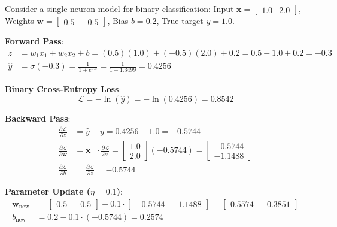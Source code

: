 \documentclass[12pt, a4paper]{report}
\theoremstyle{definition}
\begin{document}
\begin{numexample}
Consider a single-neuron model for binary classification:
Input $\mathbf{x} = \begin{bmatrix} 1.0 & 2.0 \end{bmatrix}$, Weights $\mathbf{w} = \begin{bmatrix} 0.5 & -0.5 \end{bmatrix}$, Bias $b = 0.2$, True target $y = 1.0$.

\textbf{Forward Pass}:
\begin{align*}
z &= w_1 x_1 + w_2 x_2 + b = (0.5)(1.0) + (-0.5)(2.0) + 0.2 = 0.5 - 1.0 + 0.2 = -0.3 \\
\hat{y} &= \sigma(-0.3) = \frac{1}{1 + e^{0.3}} = \frac{1}{1 + 1.3499} = \boxed{0.4256}
\end{align*}

\textbf{Binary Cross-Entropy Loss}:
\[
\mathcal{L} = -\ln(\hat{y}) = -\ln(0.4256) = \boxed{0.8542}
\]

\textbf{Backward Pass}:
\begin{align*}
\frac{\partial \mathcal{L}}{\partial z} &= \hat{y} - y = 0.4256 - 1.0 = \boxed{-0.5744} \\[4pt]
\frac{\partial \mathcal{L}}{\partial \mathbf{w}} &= \mathbf{x}^\top \cdot \frac{\partial \mathcal{L}}{\partial z} = \begin{bmatrix} 1.0 \\ 2.0 \end{bmatrix} (-0.5744) = \boxed{\begin{bmatrix} -0.5744 \\ -1.1488 \end{bmatrix}} \\[4pt]
\frac{\partial \mathcal{L}}{\partial b} &= \frac{\partial \mathcal{L}}{\partial z} = \boxed{-0.5744}
\end{align*}

\textbf{Parameter Update ($\eta = 0.1$)}:
\begin{align*}
\mathbf{w}_\text{new} &= \begin{bmatrix} 0.5 & -0.5 \end{bmatrix} - 0.1 \cdot \begin{bmatrix} -0.5744 & -1.1488 \end{bmatrix} = \boxed{\begin{bmatrix} 0.5574 & -0.3851 \end{bmatrix}} \\
b_\text{new} &= 0.2 - 0.1 \cdot (-0.5744) = \boxed{0.2574}
\end{align*}
\end{numexample}
\end{document}
